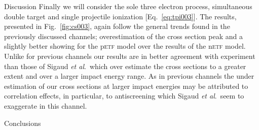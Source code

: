 \documentclass[aps, pra, reprint, groupedaddress, amsfonts,
               amsmath, amssymb, showpacs, nofootinbib]{revtex4-1}
\begin{document}
\begin{section}{Discussion \label{sec:disc}}
   Finally we will consider the sole three electron process, simultaneous double target and single
   projectile ionization [Eq.~\eqref{eq:tpi003}]. The results, presented in Fig.~\ref{fig:cs003}, again
   follow the general trends found in the previously discussed channels; overestimation of the cross
   section peak and a slightly better showing for the p\textsc{etf} model over the results of the
   n\textsc{etf} model. Unlike for previous channels our results are in better agreement with experiment
   than those of Sigaud \textit{et al}.\ which over estimate the cross sections to a greater extent and
   over a larger impact energy range. As in previous channels the under estimation of our cross sections
   at larger impact energies may be attributed to correlation effects, in particular, to antiscreening
   which  Sigaud \textit{et al}.\ seem to exaggerate in this channel.
 
\end{section}

\begin{section}{Conclusions \label{sec:conc}}
\end{section}


\end{document}
